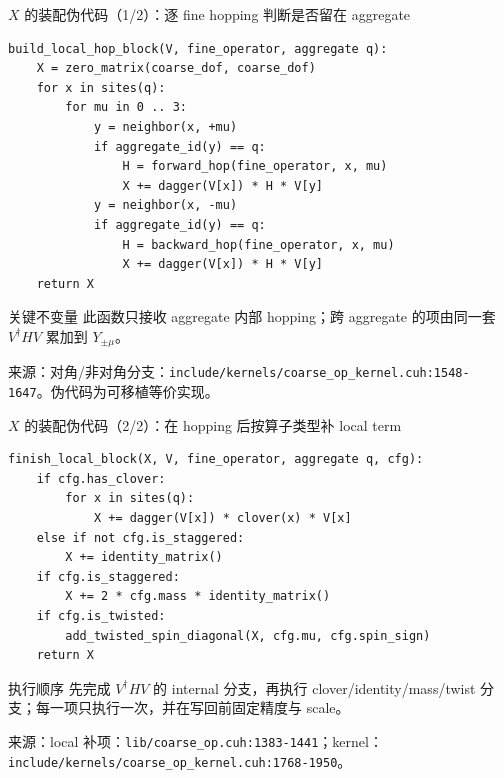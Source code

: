 \documentclass[UTF8,aspectratio=169,11pt]{ctexbeamer}
\newcommand{\source}[1]{\vspace{0.05em}\par{\raggedright\scriptsize\color{muted}来源：#1\par}}
\newcommand{\codepath}[1]{\nolinkurl{#1}}
\begin{document}
\begin{frame}[fragile,t]{\(X\) 的装配伪代码（1/2）：逐 fine hopping 判断是否留在 aggregate}
\begin{lstlisting}[firstnumber=1]
build_local_hop_block(V, fine_operator, aggregate q):
    X = zero_matrix(coarse_dof, coarse_dof)
    for x in sites(q):
        for mu in 0 .. 3:
            y = neighbor(x, +mu)
            if aggregate_id(y) == q:
                H = forward_hop(fine_operator, x, mu)
                X += dagger(V[x]) * H * V[y]
            y = neighbor(x, -mu)
            if aggregate_id(y) == q:
                H = backward_hop(fine_operator, x, mu)
                X += dagger(V[x]) * H * V[y]
    return X
\end{lstlisting}
  \vspace{0.12cm}
  \begin{alertblock}{关键不变量}
    此函数只接收 aggregate 内部 hopping；跨 aggregate 的项由同一套 \(V^\dagger H V\) 累加到 \(Y_{\pm\mu}\)。
  \end{alertblock}
  \source{对角/非对角分支：\codepath{include/kernels/coarse_op_kernel.cuh:1548-1647}。伪代码为可移植等价实现。}
\end{frame}

\begin{frame}[fragile,t]{\(X\) 的装配伪代码（2/2）：在 hopping 后按算子类型补 local term}
\begin{lstlisting}[firstnumber=1]
finish_local_block(X, V, fine_operator, aggregate q, cfg):
    if cfg.has_clover:
        for x in sites(q):
            X += dagger(V[x]) * clover(x) * V[x]
    else if not cfg.is_staggered:
        X += identity_matrix()
    if cfg.is_staggered:
        X += 2 * cfg.mass * identity_matrix()
    if cfg.is_twisted:
        add_twisted_spin_diagonal(X, cfg.mu, cfg.spin_sign)
    return X
\end{lstlisting}
  \vspace{0.12cm}
  \begin{block}{执行顺序}
    先完成 \(V^\dagger H V\) 的 internal 分支，再执行 clover/identity/mass/twist 分支；每一项只执行一次，并在写回前固定精度与 scale。
  \end{block}
  \source{local 补项：\codepath{lib/coarse_op.cuh:1383-1441}；kernel：\codepath{include/kernels/coarse_op_kernel.cuh:1768-1950}。}
\end{frame}
\end{document}
